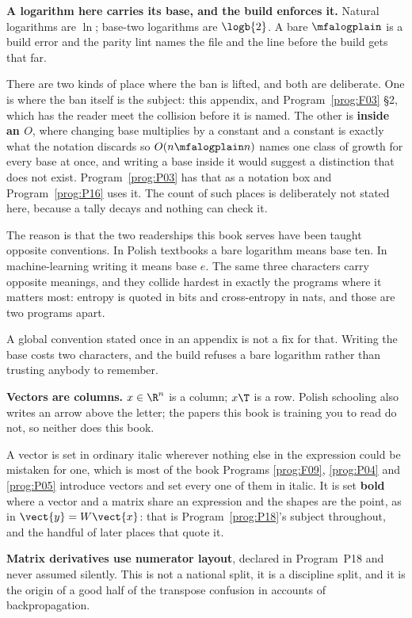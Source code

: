 \begin{notationbox}
\textbf{A logarithm here carries its base, and the build enforces it.}
Natural logarithms are $\ln$; base-two logarithms are $\logb{2}$. A bare
$\mfalogplain$ is a build error and the parity lint names the file and the
line before the build gets that far.

There are two kinds of place where the ban is lifted, and both are deliberate.
One is where the ban itself is the subject: this appendix, and
Program~\ref{prog:F03} §2, which has the reader meet the collision before it
is named. The other is \textbf{inside an $O$}, where changing base multiplies by a
constant and a constant is exactly what the notation discards \dash{} so
$O(n \mfalogplain n)$ names one class of growth for every base at once, and
writing a base inside it would suggest a distinction that does not exist.
Program~\ref{prog:P03} has that as a notation box and
Program~\ref{prog:P16} uses it. The count of such places is deliberately not
stated here, because a tally decays and nothing can check it.

The reason is that the two readerships this book serves have been taught
opposite conventions. In Polish textbooks a bare logarithm means base ten. In
machine-learning writing it means base $e$. The same three characters carry
opposite meanings, and they collide hardest in exactly the programs where it
matters most: entropy is quoted in bits and cross-entropy in nats, and those
are two programs apart.

A global convention stated once in an appendix is not a fix for that. Writing
the base costs two characters, and the build refuses a bare logarithm rather
than trusting anybody to remember.
\end{notationbox}

\begin{notationbox}
\textbf{Vectors are columns.} $x \in \R^{n}$ is a column; $x\T$ is a row.
Polish schooling also writes an arrow above the letter; the papers this book is
training you to read do not, so neither does this book.

A vector is set in ordinary italic wherever nothing else in the expression
could be mistaken for one, which is most of the book \dash{}
Programs \ref{prog:F09}, \ref{prog:P04} and \ref{prog:P05} introduce vectors
and set every one of them in italic. It is set \textbf{bold} where a vector
and a matrix share an expression and the shapes are the point, as in
$\vect{y} = W\vect{x}$: that is Program~\ref{prog:P18}'s subject throughout,
and the handful of later places that quote it.

\textbf{Matrix derivatives use numerator layout}, declared in Program~P18 and
never assumed silently. This is not a national split, it is a discipline split,
and it is the origin of a good half of the transpose confusion in accounts of
backpropagation.
\end{notationbox}

